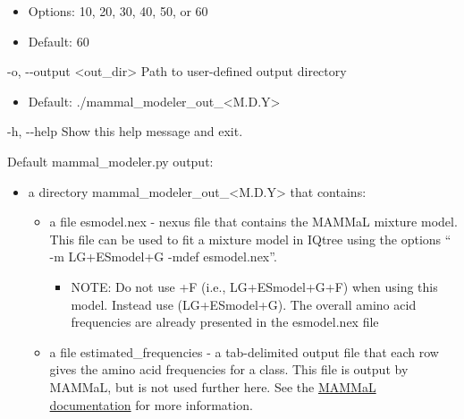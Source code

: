\documentclass{article}
\begin{document}
\begin{description}
\begin{description}
\begin{description}
                    \begin{itemize}
                        \item Options: 10, 20, 30, 40, 50, or 60
                        \item Default: 60
                    \end{itemize}
                    \item -o, -\/-output \hspace{0.2cm} <out\_dir> \hspace{0.2cm} Path to user-defined output directory
                    \begin{itemize}
                        \item Default: ./mammal\_modeler\_out\_<M.D.Y>
                    \end{itemize}
                    \item -h, -\/-help \hspace{0.2cm} Show this help message and exit.
                \end{description}
            \end{description}
            \vspace{0.2cm}
            \begin{description}
                \item Default mammal\_modeler.py output:
                \begin{itemize}
                    \item a directory mammal\_modeler\_out\_<M.D.Y> that contains:
                    \begin{itemize}
                        \item a file esmodel.nex - nexus file that contains the MAMMaL mixture model. This file can be used to fit a mixture model in IQtree using the options “ -m LG+ESmodel+G -mdef esmodel.nex”.
                        \begin{itemize}
                            \item NOTE: Do not use +F (i.e., LG+ESmodel+G+F) when using this model. Instead use (LG+ESmodel+G). The overall amino acid frequencies are already presented in the esmodel.nex file
                        \end{itemize}
                        \item a file estimated\_frequencies - a tab-delimited output file that each row gives the amino acid frequencies for a class. This file is output by MAMMaL, but is not used further here. See the \href{http://amoeba.msstate.edu/phylofisher/pdfs/mammal.pdf}{MAMMaL documentation} for more information. 
                    \end{itemize}
                \end{itemize}
            \end{description}
        \end{description}
                
\end{document}
